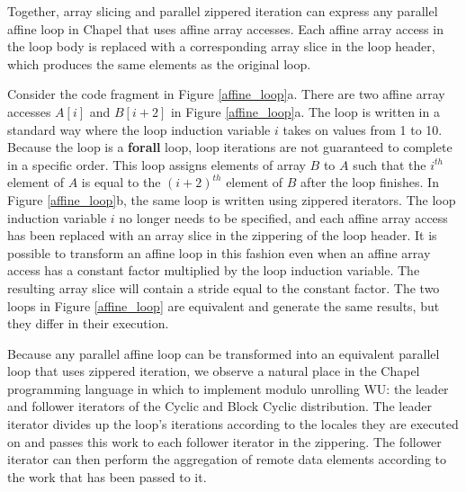 Together, array slicing and parallel zippered iteration can express any parallel affine loop in Chapel that uses affine array accesses. Each affine array access in the loop body is replaced with a corresponding array slice in the loop header, which produces the same elements as the original loop. 

Consider the code fragment in Figure \ref{affine_loop}a. There are two affine array accesses $A[i]$ and $B[i+2]$ in Figure \ref{affine_loop}a. The loop is written in a standard way where the loop induction variable $i$ takes on values from 1 to 10. Because the loop is a \textbf{forall} loop, loop iterations are not guaranteed to complete in a specific order. This loop assigns elements of array $B$ to $A$ such that the $i^{th}$ element of $A$ is equal to the $(i+2)^{th}$ element of $B$ after the loop finishes. In Figure \ref{affine_loop}b, the same loop is written using zippered iterators. The loop induction variable $i$ no longer needs to be specified, and each affine array access has been replaced with an array slice in the zippering of the loop header. It is possible to transform an affine loop in this fashion even when an affine array access has a constant factor multiplied by the loop induction variable. The resulting array slice will contain a stride equal to the constant factor. The two loops in Figure \ref{affine_loop} are equivalent and generate the same results, but they differ in their execution.

Because any parallel affine loop can be transformed into an equivalent parallel loop that uses zippered iteration, we observe a natural place in the Chapel programming language in which to implement modulo unrolling WU: the leader and follower iterators of the Cyclic and Block Cyclic distribution. The leader iterator divides up the loop's iterations according to the locales they are executed on and passes this work to each follower iterator in the zippering. The follower iterator can then perform the aggregation of remote data elements according to the work that has been passed to it. 

